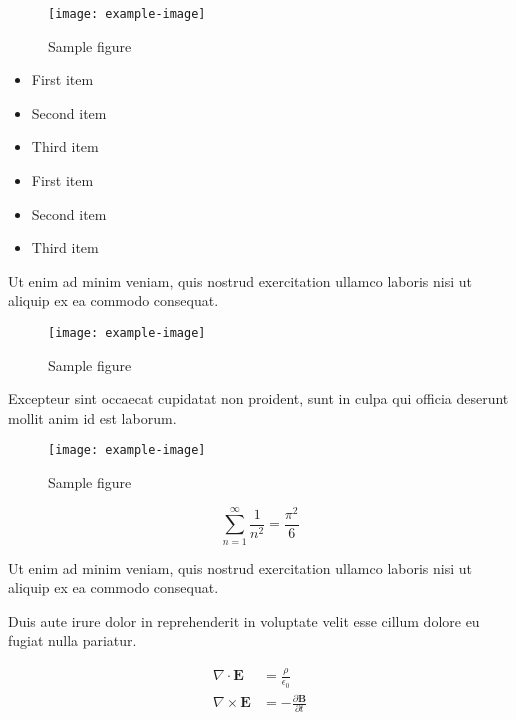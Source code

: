 \documentclass{article}
\begin{document}
\begin{figure}[h]
    \centering
    \texttt{[image: example-image]}
    \caption{Sample figure}
    \label{fig:sample}
\end{figure}

\begin{itemize}
\item First item
\item Second item
\item Third item
\end{itemize}

\begin{itemize}
\item First item
\item Second item
\item Third item
\end{itemize}

Ut enim ad minim veniam, quis nostrud exercitation ullamco laboris nisi ut aliquip ex ea commodo consequat.

\begin{figure}[h]
    \centering
    \texttt{[image: example-image]}
    \caption{Sample figure}
    \label{fig:sample}
\end{figure}

Excepteur sint occaecat cupidatat non proident, sunt in culpa qui officia deserunt mollit anim id est laborum.

\begin{figure}[h]
    \centering
    \texttt{[image: example-image]}
    \caption{Sample figure}
    \label{fig:sample}
\end{figure}

\begin{equation}
    \sum_{n=1}^{\infty} \frac{1}{n^2} = \frac{\pi^2}{6}
\end{equation}

Ut enim ad minim veniam, quis nostrud exercitation ullamco laboris nisi ut aliquip ex ea commodo consequat.

Duis aute irure dolor in reprehenderit in voluptate velit esse cillum dolore eu fugiat nulla pariatur.

\begin{align}
    \nabla \cdot \mathbf{E} &= \frac{\rho}{\epsilon_0} \\
    \nabla \times \mathbf{E} &= -\frac{\partial \mathbf{B}}{\partial t}
\end{align}
\end{document}
